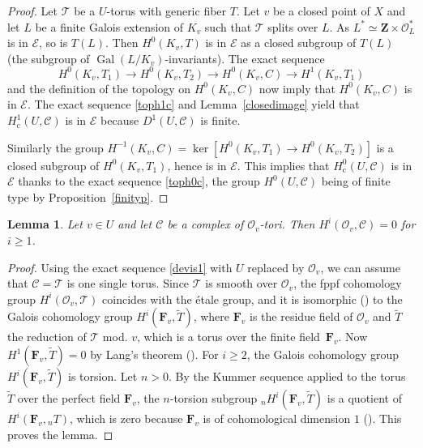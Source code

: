 \documentclass[11pt]{article}
\let\mathcal\mathscr
\newcommand{\rc}{\mathrm{c}}
\theoremstyle{plain}
\newtheorem{lem}[theo]{Lemma}
\theoremstyle{definition}
\DeclareMathOperator \gal {Gal}
\newcommand \ZZ {\mathbf{Z}}
\newcommand \FF {\mathbf{F}}
\newcommand\cO {\mathcal{O}}
\newcommand \cT {\mathcal{T}}
\newcommand \cC {\mathcal{C}}
\begin{document}
\begin{proof} Let $\cT$ be a
$U$-torus with generic fiber $T$.
Let $v$ be a closed point of $X$ and let $L$ be a finite
Galois extension of $K_v$ such
that $\cT$ splits over $L$. As $L^* \simeq \ZZ \times \cO_L^*$
is in $\mathcal E$, so is $T(L)$.
Then $H^0(K_v,T)$ is in $\mathcal E$
as a closed subgroup of $T(L)$ (the subgroup
of $\gal(L/K_v)$-invariants). The exact sequence
\[
H^0(K_v,T_1) \to H^0(K_v,T_2) \to H^0(K_v,C) \to H^1(K_v,T_1)
\]
and the definition of the topology on $H^0(K_v,C)$ now imply that
$H^0(K_v,C)$ is in $\mathcal E$. The exact sequence \eqref{toph1c}
and Lemma~\ref{closedimage} yield that $H^1_\rc(U,\cC)$ is in $\mathcal E$
because $D^1(U,\cC)$ is finite.

Similarly the group $H^{-1}(K_v,C)=\ker [H^0(K_v,T_1) \to H^0(K_v,T_2)]$ is
a closed subgroup of $H^0(K_v,T_1)$, hence is in $\mathcal E$.
This implies that $H^0_\rc(U,\cC)$ is in $\mathcal E$ thanks to the exact
sequence \eqref{toph0c},
the group $H^0(U,\cC)$ being of finite type by Proposition~\ref{finityp}.
\end{proof}

\begin{lem} \label{vanishlocal}
Let $v \in U$ and let $\cC$ be a complex of $\cO_v$-tori.
Then $H^i(\cO_v, \cC)=0$ for $i \geq 1$.
\end{lem}

\begin{proof} Using the exact sequence \eqref{devis1} with $U$ replaced
by $\cO_v$, we can assume that $\mathcal C=\mathcal T$ is one single
torus. Since $\mathcal T$ is smooth over $\cO_v$, the fppf
cohomology group $H^i(\cO_v, \cT)$ coincides with the étale
group, and it is isomorphic (\cite[Prop.\,II.1.1\,(b)]{MilADT})
to the Galois cohomology group
$H^i(\FF_v,\tilde T)$, where $\FF_v$
is the residue field of $\cO_v$ and $\tilde T$ the reduction of
$\mathcal T$ mod. $v$, which is a torus over the finite field~$\FF_v$. Now $H^1(\FF_v,\tilde T)=0$ by Lang's theorem (\cite{lang}).
For $i \geq 2$, the Galois cohomology group $H^i(\FF_v,\tilde T)$ is torsion.
Let $n >0$. By the Kummer sequence applied to the torus $\tilde T$
over the perfect field $\FF_v$, the $n$-torsion
subgroup $_n H^i(\FF_v,\tilde T)$ is a quotient of $H^i(\FF_v, {}_n T)$, which
is zero because $\FF_v$ is of cohomological dimension $1$ (\cite[Chap.\,XIII, Prop.\,2]{col}). This proves the lemma.
\end{proof}
\end{document}

